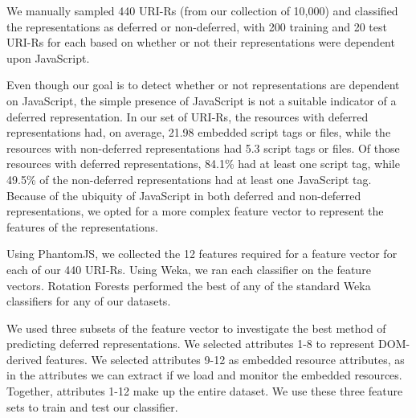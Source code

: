 \documentclass{sig-alternate}
\begin{document}
We manually sampled 440 URI-Rs (from our collection of 10,000) and classified the representations as deferred or non-deferred, with 200 training and 20 test URI-Rs for each based on whether or not their representations were dependent upon JavaScript. 


Even though our goal is to detect whether or not representations are dependent on JavaScript, the simple presence of JavaScript is not a suitable indicator of a deferred representation. In our set of URI-Rs, the resources with deferred representations had, on average, 21.98 embedded script tags or files, while the resources with non-deferred representations had 5.3 script tags or files. Of those resources with deferred representations, 84.1\% had at least one script tag, while 49.5\% of the non-deferred representations had at least one JavaScript tag. Because of the ubiquity of JavaScript in both deferred and non-deferred representations, we opted for a more complex feature vector to represent the features of the representations.

Using PhantomJS, we collected the 12 features required for a feature vector for each of our 440 URI-Rs. Using Weka, we ran each classifier on the feature vectors. Rotation Forests \cite{rotationforest} performed the best of any of the standard Weka classifiers for any of our datasets.


We used three subsets of the feature vector to investigate the best method of predicting deferred representations. We selected attributes 1-8 to represent DOM-derived features. We selected attributes 9-12 as embedded resource attributes, as in the attributes we can extract if we load and monitor the embedded resources. Together, attributes 1-12 make up the entire dataset. We use these three feature sets to train and test our classifier. 
\end{document}
